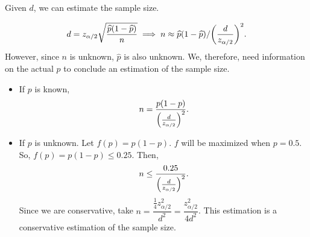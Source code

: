 \begin{prop}{}
	Given $d$, we can estimate the sample size. 
	\begin{prf}
		\[d=z_{\alpha/2}\sqrt{\dfrac{\widehat{p}(1-\widehat{p})}{n}}\implies n\approx\widehat{p}(1-\widehat{p})/\qty(\dfrac{d}{z_{\alpha/2}})^2.\] However, since $n$ is unknown, $\hat{p}$ is also unknown. We, therefore, need information on the actual $p$ to conclude an estimation of the sample size.
		\begin{itemize}
			\item If $p$ is known, \[n=\dfrac{p(1-p)}{\qty(\frac{d}{z_{\alpha/2}})^2}.\]
			\item If $p$ is unknown. Let $f(p)=p(1-p)$. $f$ will be maximized when $p=0.5$. So, $f(p)=p(1-p)\leq0.25$. Then, \[n\leq\dfrac{0.25}{\qty(\frac{d}{z_{\alpha/2}})^2}.\] Since we are conservative, take $n=\dfrac{\frac{1}{4}z_{\alpha/2}^2}{d^2}=\dfrac{z_{\alpha/2}^2}{4d^2}$. This estimation is a conservative estimation of the sample size. 
		\end{itemize}
	\end{prf}
\end{prop}

